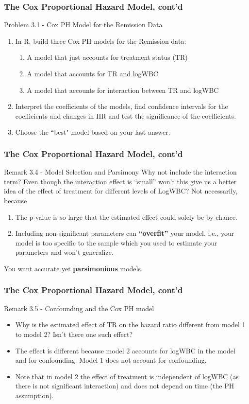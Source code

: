 \documentclass{beamer}
\theoremstyle{definition}
\begin{document}
\begin{frame}
\frametitle{The Cox Proportional Hazard Model, cont'd}
\begin{block}{Problem 3.1 - Cox PH Model for the Remission Data}
\begin{enumerate}
\item In R, build three Cox PH models for the Remission data:
\begin{enumerate}[i]
\item A model that just accounts for treatment status (TR)
\item A model that accounts for TR and logWBC
\item A model that accounts for interaction between TR and logWBC
\end{enumerate}
\item Interpret the coefficients of the models, find confidence intervals for the coefficients and changes in HR and test the significance of the coefficients.
\item Choose the ``best" model based on your last answer.
\end{enumerate}
\end{block}
\end{frame}

\begin{frame}
\frametitle{The Cox Proportional Hazard Model, cont'd}
\begin{block}{Remark 3.4 - Model Selection and Parsimony}
Why not include the interaction term? Even though the interaction effect is ``small'' won't this give us a better idea of the effect of treatment for different levels of LogWBC? Not necessarily, because
\begin{enumerate}
\item The p-value is so large that the estimated effect could solely be by chance.
\item Including non-significant parameters can \textbf{``overfit''} your model, i.e., your model is too specific to the sample which you used to estimate your parameters and won't generalize.
\end{enumerate}
You want accurate yet \textbf{parsimonious} models.
\end{block}
\end{frame}

\begin{frame}
\frametitle{The Cox Proportional Hazard Model, cont'd}
\begin{block}{Remark 3.5 - Confounding and the Cox PH model}
\begin{itemize}
\item  Why is the estimated effect of TR on the hazard ratio different from model 1 to model 2? Isn't there one such effect?
\item The effect is different because model 2 accounts for logWBC in the model and for confounding.  Model 1 does not account for confounding.
\item Note that in model 2 the effect of treatment is independent of logWBC (as there is not significant interaction) and does not depend on time (the PH assumption).
\end{itemize}
\end{block}
\end{frame}
\end{document}
